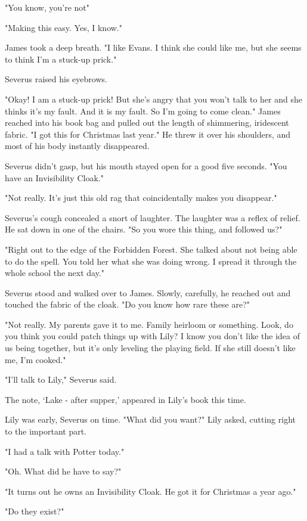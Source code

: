 "You know, you're not{\el}"

"Making this easy. Yes, I know."

James took a deep breath. "I like Evans. I think she could like me, but she seems to think I'm a stuck-up prick."

Severus raised his eyebrows.

"Okay! I am a stuck-up prick! But she's angry that you won't talk to her and she thinks it's my fault. And it is my fault. So I'm going to come clean." James reached into his book bag and pulled out the length of shimmering, iridescent fabric. "I got this for Christmas last year." He threw it over his shoulders, and most of his body instantly disappeared.

Severus didn't gasp, but his mouth stayed open for a good five seconds. "You have an Invisibility Cloak."

"Not really. It's just this old rag that coincidentally makes you disappear."

Severus's cough concealed a snort of laughter. The laughter was a reflex of relief. He sat down in one of the chairs. "So you wore this{\el} thing, and followed us?"

"Right out to the edge of the Forbidden Forest. She talked about not being able to do the spell. You told her what she was doing wrong. I spread it through the whole school the next day."

Severus stood and walked over to James. Slowly, carefully, he reached out and touched the fabric of the cloak. "Do you know how rare these are?"

"Not really. My parents gave it to me. Family heirloom or something. Look, do you think you could patch things up with Lily? I know you don't like the idea of us being together, but it's only leveling the playing field. If she still doesn't like me, I'm cooked."

"I'll talk to Lily," Severus said.

The note, `Lake - after supper,' appeared in Lily's book this time.

Lily was early, Severus on time. "What did you want?" Lily asked, cutting right to the important part.

"I had a talk with Potter today."

"Oh. What did he have to say?"

"It turns out he owns an Invisibility Cloak. He got it for Christmas a year ago."

"Do they exist?"

